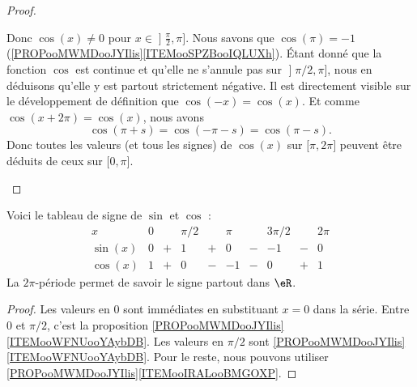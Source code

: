 \begin{proof}
\begin{subproof}
			Donc \( \cos(x)\neq 0\) pour \( x\in \mathopen] \frac{ \pi }{2} , \pi \mathclose]\).
		\spitem[\( \cos(x)<0\) sur \( {\mathopen] \pi/2 , \pi \mathclose]}\)]
		Nous savons que \( \cos(\pi)=-1\) (\ref{PROPooMWMDooJYIlis}\ref{ITEMooSPZBooIQLUXh}). Étant donné que la fonction \( \cos\) est continue et qu'elle ne s'annule pas sur \( \mathopen] \pi/2 , \pi \mathclose]\), nous en déduisons qu'elle y est partout strictement négative.
		Il est directement visible sur le développement de définition que \( \cos(-x)=\cos(x)\). Et comme \( \cos(x+2\pi)=\cos(x)\), nous avons
		\begin{equation}
			\cos(\pi+s)=\cos(-\pi-s)=\cos(\pi-s).
		\end{equation}
		Donc toutes les valeurs (et tous les signes) de \( \cos(x)\) sur \(\mathopen[ \pi , 2\pi \mathclose] \) peuvent être déduits de ceux sur \( \mathopen[ 0 , \pi \mathclose]\).

	\end{subproof}
\end{proof}

\begin{proposition}	\label{PROPooJGEHooOohyAj}
	Voici le tableau de signe de \( \sin\) et \( \cos\) :
	\begin{equation}
		\begin{array}{c|ccccccccc}
			x       & 0 &   & \pi/2 &   & \pi &   & 3\pi/2 &   & 2\pi \\
			\hline
			\sin(x) & 0 & + & 1     & + & 0   & - & -1     & - & 0    \\
			\hline
			\cos(x) & 1 & + & 0     & - & -1  & - & 0      & + & 1
		\end{array}
	\end{equation}
	La \( 2\pi\)-période permet de savoir le signe partout dans \( \eR\).
\end{proposition}

\begin{proof}
	Les valeurs en \( 0\) sont immédiates en substituant \( x=0\) dans la série. Entre \( 0\) et \( \pi/2\), c'est la proposition \ref{PROPooMWMDooJYIlis}\ref{ITEMooWFNUooYAybDB}. Les valeurs en \( \pi/2\) sont \ref{PROPooMWMDooJYIlis}\ref{ITEMooWFNUooYAybDB}. Pour le reste, nous pouvons utiliser \ref{PROPooMWMDooJYIlis}\ref{ITEMooIRALooBMGOXP}.
\end{proof}


